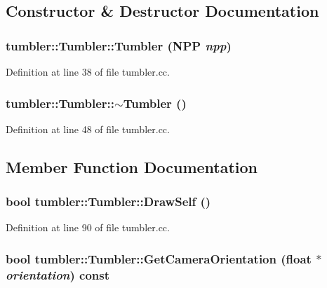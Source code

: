 \subsection{Constructor \& Destructor Documentation}
\hypertarget{classtumbler_1_1_tumbler_a4f5dd0baa068ccb8214b0e477f7cd94b}{
\subsubsection[{Tumbler}]{\setlength{\rightskip}{0pt plus 5cm}tumbler::Tumbler::Tumbler ({\bf NPP} {\em npp})}}
\label{classtumbler_1_1_tumbler_a4f5dd0baa068ccb8214b0e477f7cd94b}


Definition at line 38 of file tumbler.cc.

\hypertarget{classtumbler_1_1_tumbler_a80349e180aa825c15d63bada00c6e9a8}{
\subsubsection[{$\sim$Tumbler}]{\setlength{\rightskip}{0pt plus 5cm}tumbler::Tumbler::$\sim$Tumbler ()}}
\label{classtumbler_1_1_tumbler_a80349e180aa825c15d63bada00c6e9a8}


Definition at line 48 of file tumbler.cc.



\subsection{Member Function Documentation}
\hypertarget{classtumbler_1_1_tumbler_a8da0b0b0e85708487c55f6ca5c999da1}{
\subsubsection[{DrawSelf}]{\setlength{\rightskip}{0pt plus 5cm}bool tumbler::Tumbler::DrawSelf ()}}
\label{classtumbler_1_1_tumbler_a8da0b0b0e85708487c55f6ca5c999da1}


Definition at line 90 of file tumbler.cc.

\hypertarget{classtumbler_1_1_tumbler_a5e01d6cde9baab4e5c2aa4b834733bf2}{
\subsubsection[{GetCameraOrientation}]{\setlength{\rightskip}{0pt plus 5cm}bool tumbler::Tumbler::GetCameraOrientation (float $\ast$ {\em orientation}) const}}
\label{classtumbler_1_1_tumbler_a5e01d6cde9baab4e5c2aa4b834733bf2}


